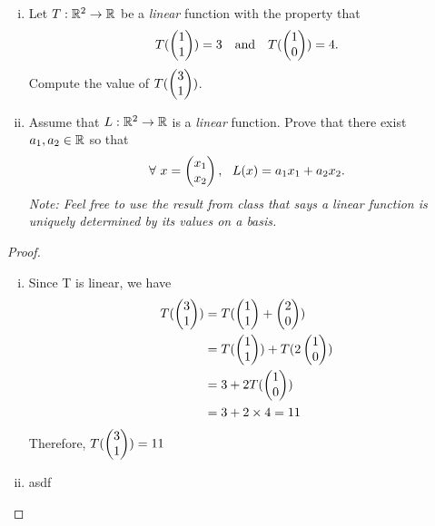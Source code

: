 \begin{question}
	\normalfont
	
	
	\begin{enumerate}[(i)]
		\item Let $T:{\mathbb R}^2\to{\mathbb R}$ be a \emph{linear} function with the property that
		\begin{align*}
			T(\ColVecTwo{1}{1}) = 3\ \ \ \text{and}\ \ \ 
			T(\ColVecTwo{1}{0}) = 4.
		\end{align*}
		Compute the value of $T(\begin{pmatrix} 3\\ 1\end{pmatrix})$.
		
		\item Assume that $L:{\mathbb R}^2\to{\mathbb R}$ is a \emph{linear} function.  Prove that there exist $a_1,a_2\in{\mathbb R}$ so that 
		\begin{align*}
			\forall\ x=\begin{pmatrix} x_1\\ x_2\end{pmatrix},\ \ L(x) = a_1x_1 + a_2x_2.
		\end{align*}
		\emph{Note: Feel free to use the result from class that says a linear function is uniquely determined by its values on a basis.}
	\end{enumerate}
\end{question}

\begin{proof}
	\renewcommand{\qedsymbol}{$\blacksquare$}
	\begin{enumerate}[(i)]
		\item Since T is linear, we have
		\begin{equation*}
			\begin{aligned}
				T(\begin{pmatrix} 3\\ 1\end{pmatrix})
				&=T(\begin{pmatrix} 1\\ 1\end{pmatrix}+\begin{pmatrix} 2\\ 0\end{pmatrix})\\
				&=T(\begin{pmatrix} 1\\ 1\end{pmatrix})+T(2\begin{pmatrix} 1\\ 0\end{pmatrix})\\
				&=3+2T(\begin{pmatrix} 1\\ 0\end{pmatrix})\\
				&=3+2\times4
				=11
			\end{aligned}
		\end{equation*}
		Therefore, $T(\begin{pmatrix} 3\\ 1\end{pmatrix})=11$
		\item asdf
	\end{enumerate}

	\renewcommand{\qedsymbol}{}
\end{proof}
